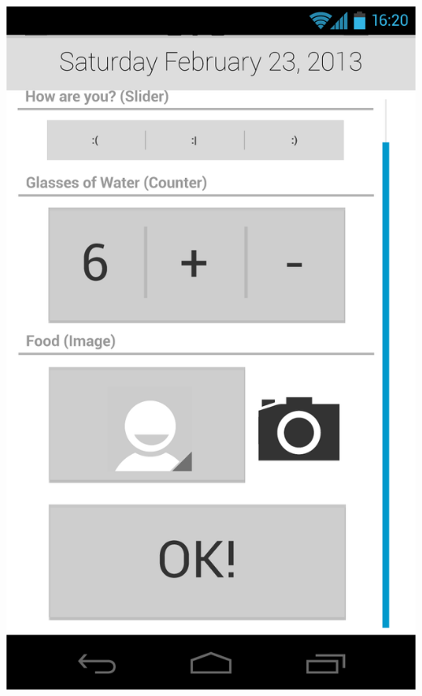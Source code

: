 \documentclass[pdftex,12pt,a4paper]{report}
\begin{document}
\begin{center}
	\includegraphics[scale=0.18]{Screens/03-Add--Scrolled.png}

\end{center}
\end{document}
